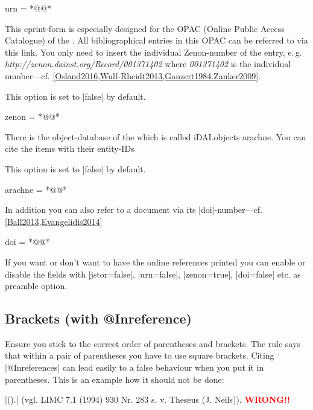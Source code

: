 \documentclass[a4paper,
10pt,
greek,
french,
spanish,
italian,
ngerman,
english,
]{ltxdoc}
\begin{document}
\begin{code}
urn = *@@*
\end{code}  

This eprint-form is especially designed for the OPAC (Online Public Access Catalogue) of the \DAI.
All bibliographical entries in this OPAC can be referred to via this link.
You only need to insert the individual Zenon-number of the entry, e.\,g. \emph{http://zenon.dainst.org/Record/001371402} where \emph{001371402} is the individual number---cf. \cref{Osland2016,Wulf-Rheidt2013,Ganzert1984.Zanker2009}.

This option is set to |false| by default.
\begin{code}
zenon = *@@*
\end{code}      

There is the object-database of the \DAI which is called iDAI.objects arachne. 
You can cite the items with their entity-IDs 


This option is set to |false| by default.
\begin{code}
arachne = *@@*
\end{code}      



 In addition you can also refer to a document via its |doi|-number---cf. \cref{Ball2013,Evangelidis2014} 
\begin{code}
doi = *@@*
\end{code}  

If you want or don’t want to have the online references printed you can enable or disable the fields with |jstor=false|, 
|urn=false|,
|zenon=true|,
|doi=false| etc. as preamble option.

\subsection{Brackets (with @Inreference)}\label{faq:inreference}
Ensure you stick to the correct order of parentheses and brackets.
The rule says that within a pair of parentheses you have to use square brackets.
Citing |@Inreferences| can lead easily to a false behaviour when you put it in parentheses.
This is an example how it should not be done:
\begin{tcolorbox}[examplebox]
|(\cite[vgl.][930 Nr. 283]{Neils1994}).| 
\tcblower
(vgl. LIMC 7.1 (1994) 930 Nr. 283 s. v. Theseus (J. Neils)). \textcolor{red}{\textbf{WRONG!!}}
\end{tcolorbox}
 
\end{document}
